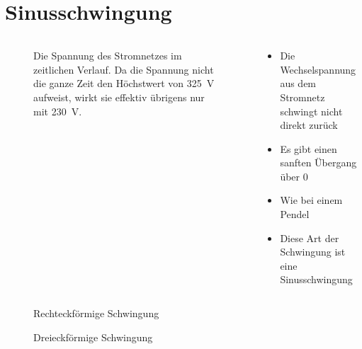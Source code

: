 
\section{Sinusschwingung}
\label{section:sinusschwingung}
\begin{frame}%

\begin{columns}
    \begin{column}{0.48\textwidth}
    
\begin{figure}
    \caption{\scriptsize Die Spannung des Stromnetzes im zeitlichen Verlauf. Da die Spannung nicht die ganze Zeit den Höchstwert von \qty{325}{\volt} aufweist, wirkt sie effektiv übrigens nur mit \qty{230}{\volt}.}
    \label{n_frequenz_sinusschwingung}
\end{figure}


    \end{column}
   \begin{column}{0.48\textwidth}
       \begin{itemize}
  \item Die Wechselspannung aus dem Stromnetz schwingt nicht direkt zurück
  \item Es gibt einen sanften Übergang über 0
  \item Wie bei einem Pendel
  \item Diese Art der Schwingung ist eine Sinusschwingung
  \end{itemize}

   \end{column}
\end{columns}

\end{frame}

\begin{frame}
\begin{figure}
    \caption{\scriptsize Rechteckförmige Schwingung}
    \label{sinusschwingung_rechteck}
\end{figure}

\end{frame}

\begin{frame}
\begin{figure}
    \caption{\scriptsize Dreieckförmige Schwingung}
    \label{sinusschwingung_dreieck}
\end{figure}

\end{frame}

